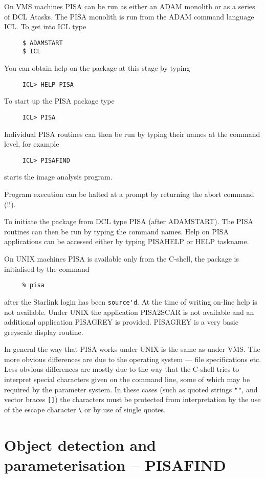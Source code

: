 On VMS machines PISA can be run as either an ADAM monolith or as a
series of DCL Atasks. The PISA monolith is run from the ADAM command
language ICL. To get  into ICL type
\begin{verbatim}
     $ ADAMSTART
     $ ICL
\end{verbatim}
You can obtain help on the package at this stage by typing
\begin{verbatim}
     ICL> HELP PISA
\end{verbatim}
To start up the PISA package type
\begin{verbatim}
     ICL> PISA
\end{verbatim}
Individual PISA routines can then be run by typing their names at the
command level, for example
\begin{verbatim}
     ICL> PISAFIND
\end{verbatim}
starts the image analysis program.

Program execution can be halted at a prompt by returning the abort
command (!!).

To initiate the package from DCL type PISA (after ADAMSTART). The PISA
routines can then be run by typing the command names. Help on PISA
applications can be accessed either by typing PISAHELP or HELP taskname.

On UNIX machines PISA is available only from the C-shell, the package is
initialised by the command
\begin{verbatim}
     % pisa
\end{verbatim}

after the Starlink login has been \verb+source'd+. At the time of
writing on-line help is not available. Under UNIX the application
PISA2SCAR is not available and an additional application PISAGREY is
provided. PISAGREY is a very basic greyscale display routine.

In general the way that PISA works under UNIX is the same as under VMS.
The more obvious differences are due to the operating system --- file
specifications etc. Less obvious differences are mostly due to the way
that the C-shell tries to interpret special characters given on the
command line, some of which may be required by the parameter system. In
these cases (such as quoted strings \verb+""+, and vector braces
\verb+[]+) the characters must be protected from interpretation by the
use of the escape character \verb+\+ or by use of single quotes.

\section{Object detection and parameterisation -- PISAFIND}

